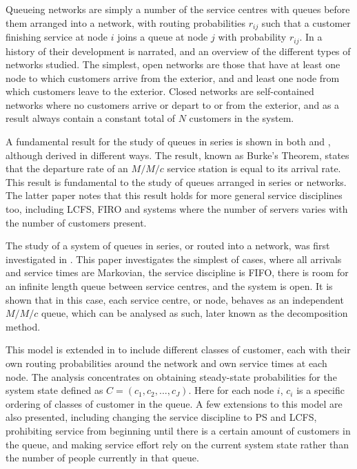 \documentclass{article}
\begin{document}
Queueing networks are simply a number of the service centres with queues before them arranged into a network, with routing probabilities $r_{ij}$ such that a customer finishing service at node $i$ joins a queue at node $j$ with probability $r_{ij}$.
In \cite{rege90} a history of their development is narrated, and an overview of the different types of networks studied.
The simplest, open networks are those that have at least one node to which customers arrive from the exterior, and and least one node from which customers leave to the exterior.
Closed networks are self-contained networks where no customers arrive or depart to or from the exterior, and as a result always contain a constant total of $N$ customers in the system.

A fundamental result for the study of queues in series is shown in both \cite{burke56} and \cite{reich57}, although derived in different ways.
The result, known as Burke's Theorem, states that the departure rate of an $M/M/c$ service station is equal to its arrival rate.
This result is fundamental to the study of queues arranged in series or networks.
The latter paper notes that this result holds for more general service disciplines too, including LCFS, FIRO and systems where the number of servers varies with the number of customers present.

The study of a system of queues in series, or routed into a network, was first investigated in \cite{jackson57}.
This paper investigates the simplest of cases, where all arrivals and service times are Markovian, the service discipline is FIFO, there is room for an infinite length queue between service centres, and the system is open.
It is shown that in this case, each service centre, or node, behaves as an independent $M/M/c$ queue, which can be analysed as such, later known as the decomposition method.

This model is extended in \cite{kelly75} to include different classes of customer, each with their own routing probabilities around the network and own service times at each node.
The analysis concentrates on obtaining steady-state probabilities for the system state defined as $C = (c_1, c_2, ... , c_J)$.
Here for each node $i$, $c_i$ is a specific ordering of classes of customer in the queue.
A few extensions to this model are also presented, including changing the service discipline to PS and LCFS, prohibiting service from beginning until there is a certain amount of customers in the queue, and making service effort rely on the current system state rather than the number of people currently in that queue.
\end{document}
